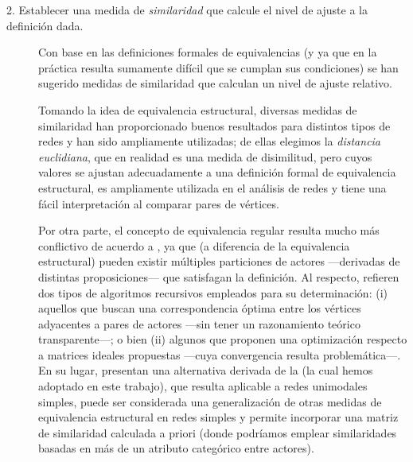 \documentclass[letterpaper, 11pt]{book}
\theoremstyle{definition}
\theoremstyle{remark}
\begin{document}
\begin{description}
    \item[2. Establecer una medida de \emph{similaridad} que calcule el nivel de ajuste a la definición dada.] 
    Con base en las definiciones formales de equivalencias (y ya que en la práctica resulta sumamente difícil que se cumplan sus condiciones) se han sugerido medidas de similaridad que calculan un nivel de ajuste relativo. 
    
    Tomando la idea de equivalencia estructural, diversas medidas de similaridad han proporcionado buenos resultados para distintos tipos de redes y han sido ampliamente utilizadas; 
    de ellas elegimos la \emph{distancia euclidiana}, que en realidad es una medida de disimilitud, pero cuyos valores se ajustan adecuadamente a una definición formal de equivalencia estructural, es ampliamente utilizada en el análisis de redes y tiene una fácil interpretación al comparar pares de vértices. 
    
    Por otra parte, el concepto de equivalencia regular resulta mucho más conflictivo de acuerdo a \citet{1994_Wasserman_SNA}, ya que (a diferencia de la equivalencia estructural) pueden existir múltiples particiones de actores ---derivadas de distintas proposiciones--- que satisfagan la definición. 
    Al respecto, \citet{2006_Newman_Similarity} refieren dos tipos de algoritmos recursivos empleados para su determinación: 
    (i) aquellos que buscan una correspondencia óptima entre los vértices adyacentes a pares de actores ---sin tener un razonamiento teórico transparente---; 
    o bien (ii) algunos que proponen una optimización respecto a matrices ideales propuestas ---cuya convergencia resulta problemática---. 
    En su lugar, presentan una alternativa derivada de la  (la cual hemos adoptado en este trabajo), que resulta aplicable a redes unimodales simples, puede ser considerada una generalización de otras medidas de equivalencia estructural en redes simples y permite incorporar una matriz de similaridad calculada a priori (donde podríamos emplear similaridades basadas en más de un atributo categórico entre actores). 
    

\end{description}
\end{document}
